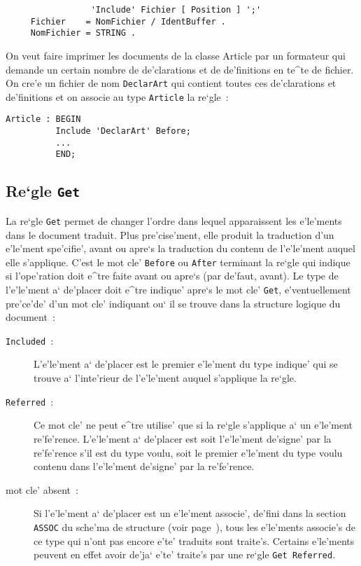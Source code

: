 {\begin{verbatim}
                 'Include' Fichier [ Position ] ';'
     Fichier    = NomFichier / IdentBuffer .
     NomFichier = STRING .
\end{verbatim}

\begin{example}
On veut faire imprimer les documents de la classe Article par un formateur
qui demande un certain nombre de de'clarations et de de'finitions en te^te de
fichier. On cre'e un fichier de nom {\tt DeclarArt} qui contient toutes ces
de'clarations et de'finitions et on associe au type {\tt Article} la re`gle~:
\begin{verbatim}
Article : BEGIN
          Include 'DeclarArt' Before;
          ...
          END;
\end{verbatim}
\end{example}

\subsection{Re`gle {\tt Get}}

La re`gle {\tt Get} permet de changer l'ordre dans lequel apparaissent les
e'le'ments dans le document traduit. Plus pre'cise'ment, elle produit la
traduction d'un e'le'ment spe'cifie', avant ou apre`s la traduction du contenu
de l'e'le'ment auquel elle s'applique. C'est le mot cle' {\tt Before} ou
{\tt After} terminant la re`gle qui indique si l'ope'ration doit e^tre faite
avant ou apre`s (par de'faut, avant). Le type de l'e'le'ment a` de'placer doit
e^tre indique' apre`s le mot cle' {\tt Get}, e'ventuellement pre'ce'de' d'un mot cle'
indiquant ou` il se trouve dans la structure logique du document~:
\begin{description}
\item[ {\tt Included}~: ]
 L'e'le'ment a` de'placer est le premier e'le'ment du type indique' qui se trouve
 a` l'inte'rieur de l'e'le'ment auquel s'applique la re`gle.
\item[ {\tt Referred}~: ]
 Ce mot cle' ne peut e^tre utilise' que si la re`gle s'applique a` un e'le'ment
 re'fe'rence. L'e'le'ment a` de'placer est soit l'e'le'ment de'signe' par la re'fe'rence
 s'il est du type voulu, soit le premier e'le'ment du type voulu contenu dans
 l'e'le'ment de'signe' par la re'fe'rence.
\item[ mot cle' absent~: ]
 Si l'e'le'ment a` de'placer est un e'le'ment associe', de'fini dans la section
 {\tt ASSOC} du sche'ma de structure (voir page~\pageref{elemassoc}), tous les
 e'le'ments associe's de ce type qui n'ont pas encore e'te' traduits sont traite's.
 Certains e'le'ments peuvent en effet avoir de'ja` e'te' traite's par une re`gle
 {\tt Get Referred}.


\end{description}}
